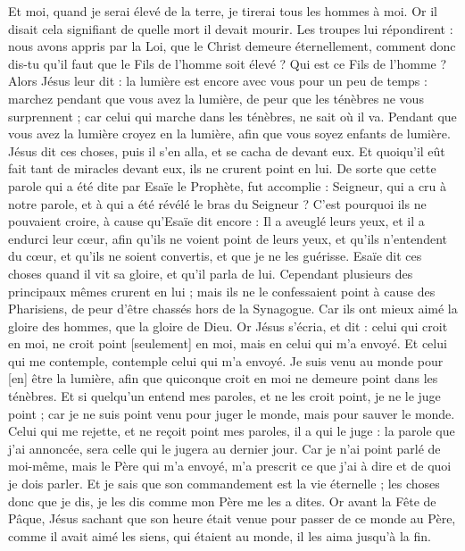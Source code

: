 \begin{multicols}{2}
Et moi, quand je serai élevé de la terre, je tirerai tous les hommes à moi.
Or il disait cela signifiant de quelle mort il devait mourir.
Les troupes lui répondirent : nous avons appris par la Loi, que le Christ demeure éternellement, comment donc dis-tu qu'il faut que le Fils de l'homme soit élevé ? Qui est ce Fils de l'homme ?
Alors Jésus leur dit : la lumière est encore avec vous pour un peu de temps : marchez pendant que vous avez la lumière, de peur que les ténèbres ne vous surprennent ; car celui qui marche dans les ténèbres, ne sait où il va.
Pendant que vous avez la lumière croyez en la lumière, afin que vous soyez enfants de lumière. Jésus dit ces choses, puis il s'en alla, et se cacha de devant eux.
Et quoiqu'il eût fait tant de miracles devant eux, ils ne crurent point en lui.
De sorte que cette parole qui a été dite par Esaïe le Prophète, fut accomplie : Seigneur, qui a cru à notre parole, et à qui a été révélé le bras du Seigneur ?
C'est pourquoi ils ne pouvaient croire, à cause qu'Esaïe dit encore :
Il a aveuglé leurs yeux, et il a endurci leur cœur, afin qu'ils ne voient point de leurs yeux, et qu'ils n'entendent du cœur, et qu'ils ne soient convertis, et que je ne les guérisse.
Esaïe dit ces choses quand il vit sa gloire, et qu'il parla de lui.
Cependant plusieurs des principaux mêmes crurent en lui ; mais ils ne le confessaient point à cause des Pharisiens, de peur d'être chassés hors de la Synagogue.
Car ils ont mieux aimé la gloire des hommes, que la gloire de Dieu.
Or Jésus s'écria, et dit : celui qui croit en moi, ne croit point [seulement] en moi, mais en celui qui m'a envoyé.
Et celui qui me contemple, contemple celui qui m'a envoyé.
Je suis venu au monde pour [en] être la lumière, afin que quiconque croit en moi ne demeure point dans les ténèbres.
Et si quelqu'un entend mes paroles, et ne les croit point, je ne le juge point ; car je ne suis point venu pour juger le monde, mais pour sauver le monde.
Celui qui me rejette, et ne reçoit point mes paroles, il a qui le juge : la parole que j'ai annoncée, sera celle qui le jugera au dernier jour.
Car je n'ai point parlé de moi-même, mais le Père qui m'a envoyé, m'a prescrit ce que j'ai à dire et de quoi je dois parler.
Et je sais que son commandement est la vie éternelle ; les choses donc que je dis, je les dis comme mon Père me les a dites.
\VerseOne{}Or avant la Fête de Pâque, Jésus sachant que son heure était venue pour passer de ce monde au Père, comme il avait aimé les siens, qui étaient au monde, il les aima jusqu'à la fin.

\end{multicols}
